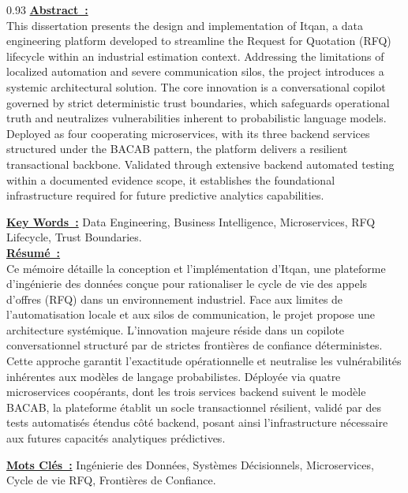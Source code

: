\vspace{-0.1cm}
\begin{spacing}{0.93}
\fontsize{10pt}{10.8pt}\selectfont%
\underline{\textbf{Abstract~:}}\\
This dissertation presents the design and implementation of Itqan, a data engineering platform developed to streamline the Request for Quotation (RFQ) lifecycle within an industrial estimation context. Addressing the limitations of localized automation and severe communication silos, the project introduces a systemic architectural solution. The core innovation is a conversational copilot governed by strict deterministic trust boundaries, which safeguards operational truth and neutralizes vulnerabilities inherent to probabilistic language models. Deployed as four cooperating microservices, with its three backend services structured under the BACAB pattern, the platform delivers a resilient transactional backbone. Validated through extensive backend automated testing within a documented evidence scope, it establishes the foundational infrastructure required for future predictive analytics capabilities.\par
\vspace{0.04cm}
\underline{\textbf{Key Words~:}} Data Engineering, Business Intelligence, Microservices, RFQ Lifecycle, Trust Boundaries.\\[0.12cm]

\underline{\textbf{Résumé~:}}\\
Ce mémoire détaille la conception et l'implémentation d'Itqan, une plateforme d'ingénierie des données conçue pour rationaliser le cycle de vie des appels d'offres (RFQ) dans un environnement industriel. Face aux limites de l'automatisation locale et aux silos de communication, le projet propose une architecture systémique. L'innovation majeure réside dans un copilote conversationnel structuré par de strictes frontières de confiance déterministes. Cette approche garantit l'exactitude opérationnelle et neutralise les vulnérabilités inhérentes aux modèles de langage probabilistes. Déployée via quatre microservices coopérants, dont les trois services backend suivent le modèle BACAB, la plateforme établit un socle transactionnel résilient, validé par des tests automatisés étendus côté backend, posant ainsi l'infrastructure nécessaire aux futures capacités analytiques prédictives.\par
\vspace{0.04cm}
\underline{\textbf{Mots Clés~:}} Ingénierie des Données, Systèmes Décisionnels, Microservices, Cycle de vie RFQ, Frontières de Confiance.\\[0.12cm]


\end{spacing}
